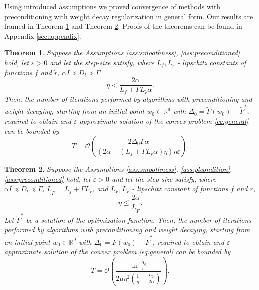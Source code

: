 \documentclass[USenglish]{article}
\theoremstyle{dgthm}
\newtheorem{theorem}{Theorem}
\theoremstyle{dgdef}
\begin{document}
Using introduced assumptions we proved convergence of methods with preconditioning with weight decay regularization in general form. Our results are framed in Theorem \ref{theor:1} and Theorem \ref{theor:2}. Proofs of the theorems can be found in Appendix \ref{sec:appendix}.

\begin{theorem} 
    \label{theor:1}
    Suppose the Assumptions \ref{ass:smoothness}, \ref{ass:preconditioned} hold, let $\varepsilon > 0$ and let the step-size satisfy, where $L_f, L_{\tilde{r}}$ - lipschitz constants of functions $f$ and $\tilde{r}$, $\alpha I \preccurlyeq D_t \preccurlyeq \Gamma$
    \begin{equation*}
        \eta < \frac{2 \alpha}{L_f + \Gamma L_{\tilde{r}} \alpha}.
    \end{equation*}
    Then, the number of iterations performed by algorithms with preconditioning and weight decaying, starting from an initial point $w_0 \in \mathbb{R}^d$ with $\Delta_0 = \tilde{F}(w_0) - \tilde{F}^*$, required to obtain and $\varepsilon$-approximate solution of the convex problem \eqref{eq:general} can be bounded by
    \begin{equation*}
          T = \mathcal{O}\left( \frac{2\Delta_0 \Gamma \alpha } {\left(2\alpha - \left( L_f + \Gamma L_{\tilde{r}} \alpha \right)\eta \right) \eta \varepsilon} \right).
    \end{equation*}
\end{theorem}

\begin{theorem}
\label{theor:2}
    Suppose the Assumptions \ref{ass:smoothness}, \ref{ass:plcondition}, \ref{ass:preconditioned} hold, let $\varepsilon > 0$ and let the step-size satisfy, where $\alpha I \preccurlyeq D_t \preccurlyeq \Gamma$, $L_{\tilde{F}} = L_{f} + \Gamma L_{r}$, and $L_{F}, L_{r}$ - lipschitz constant of functions $f$ and $r$, 
    \begin{equation*}
        \eta \leq \frac{2 \alpha}{L_{\widetilde{F}}}.
    \end{equation*}
    Let $\tilde{F}^*$ be a solution of the optimization function. Then, the number of iterations performed by algorithms with preconditioning and weight decaying, starting from an initial point $w_0 \in \mathbb{R}^d$ with $\Delta_0 = \tilde{F}(w_0) - \tilde{F}^*$, required to obtain and $\varepsilon$-approximate solution of the convex problem \eqref{eq:general} can be bounded by
    \begin{equation*}
        T =  \mathcal{O}\left( \frac{\ln \frac{\Delta_0}{\epsilon}}{2 \mu \eta^2 \left(\frac{1}{\eta} - \frac{L_{\tilde{F}}}{2 \alpha} \right)} \right).
    \end{equation*}
\end{theorem}
\end{document}
